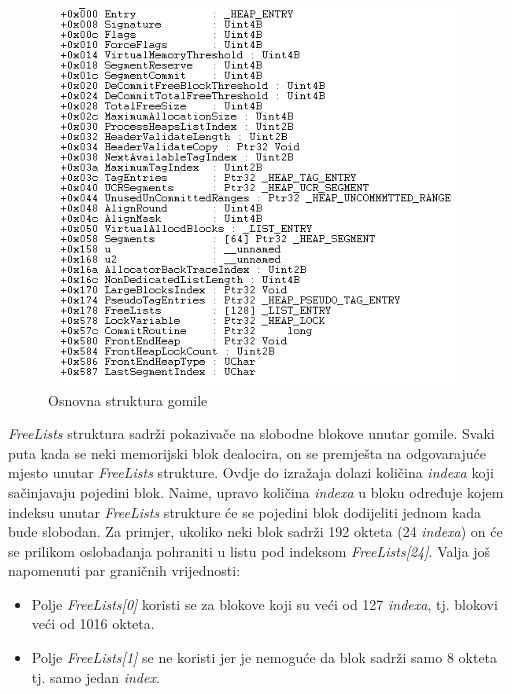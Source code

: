 \documentclass[times, utf8, diplomski, numeric]{fer}
\begin{document}
\begin{figure}[!ht]
\centering
\setlength\fboxsep{0pt}
\setlength\fboxrule{0.5pt}
\includegraphics[width=12cm, height=10cm]{slike/heap_structure}
\caption{Osnovna struktura gomile \citep{heapOverflow_infosec}}
\label{fig:heap_structure} 
\end{figure}

\emph{FreeLists} struktura sadrži pokazivače na slobodne blokove
unutar gomile. Svaki puta kada se neki memorijski blok dealocira,
on se premješta na odgovarajuće mjesto unutar \emph{FreeLists}
strukture. Ovdje do izražaja dolazi količina \emph{indexa} koji
sačinjavaju pojedini blok. Naime, upravo količina \emph{indexa} u
bloku određuje kojem indeksu unutar \emph{FreeLists} strukture će
se pojedini blok dodijeliti jednom kada bude slobodan. Za
primjer, ukoliko neki blok sadrži 192 okteta (24 \emph{indexa}) 
on će se prilikom oslobađanja pohraniti u listu pod indeksom
\emph{FreeLists[24]}. Valja još napomenuti par graničnih
vrijednosti:

\begin{itemize}

\item Polje \emph{FreeLists[0]} koristi se za blokove koji su
veći od 127 \emph{indexa}, tj. blokovi veći od 1016 okteta.

\item Polje \emph{FreeLists[1]} se ne koristi jer je nemoguće da
blok sadrži samo 8 okteta tj. samo jedan \emph{index}.

\end{itemize}
\end{document}
